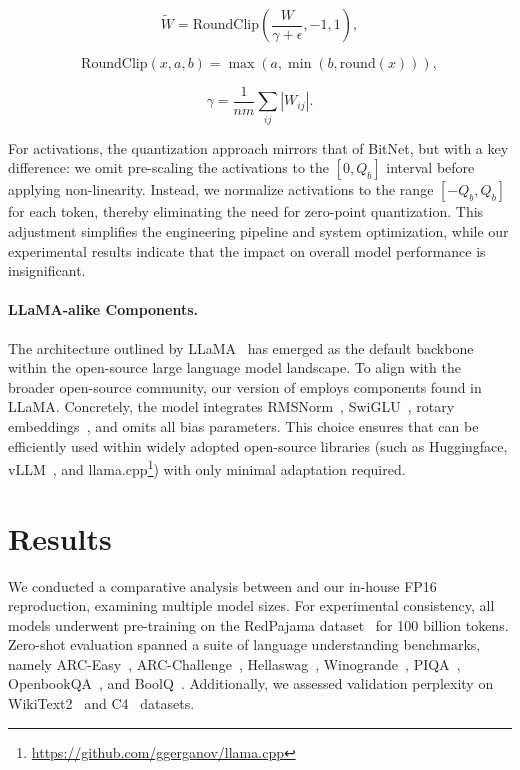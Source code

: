 \begin{equation}
    \widetilde{W} = \mathrm{RoundClip}(\frac{W}{\gamma + \epsilon}, -1, 1),
\end{equation}

\begin{equation}
    \mathrm{RoundClip}(x, a, b) = \max(a, \min(b, \mathrm{round}(x))),
\end{equation}

\begin{equation}
    \gamma = \frac{1}{nm}\sum_{ij} |W_{ij}|.
\end{equation}

For activations, the quantization approach mirrors that of BitNet, but with a key difference: we omit pre-scaling the activations to the $[0, Q_b]$ interval before applying non-linearity. Instead, we normalize activations to the range $[-Q_b, Q_b]$ for each token, thereby eliminating the need for zero-point quantization. This adjustment simplifies the engineering pipeline and system optimization, while our experimental results indicate that the impact on overall model performance is insignificant.

\paragraph{LLaMA-alike Components.}

The architecture outlined by LLaMA~\cite{llama, llama2} has emerged as the default backbone within the open-source large language model landscape. To align with the broader open-source community, our version of  employs components found in LLaMA. Concretely, the model integrates RMSNorm~\cite{rmsnorm}, SwiGLU~\cite{swiglu}, rotary embeddings~\cite{rope}, and omits all bias parameters. This choice ensures that  can be efficiently used within widely adopted open-source libraries (such as Huggingface, vLLM~\cite{vllm}, and llama.cpp\footnote{\url{https://github.com/ggerganov/llama.cpp}}) with only minimal adaptation required.

\section{Results}

We conducted a comparative analysis between  and our in-house FP16  reproduction, examining multiple model sizes. For experimental consistency, all models underwent pre-training on the RedPajama dataset~\cite{redpajama} for 100 billion tokens. Zero-shot evaluation spanned a suite of language understanding benchmarks, namely ARC-Easy~\cite{arc}, ARC-Challenge~\cite{arc}, Hellaswag~\cite{hellaswag}, Winogrande~\cite{winoGrande}, PIQA~\cite{piqa}, OpenbookQA~\cite{openbookqa}, and BoolQ~\cite{boolq}. Additionally, we assessed validation perplexity on WikiText2~\cite{wikitext2} and C4~\cite{c4} datasets.


